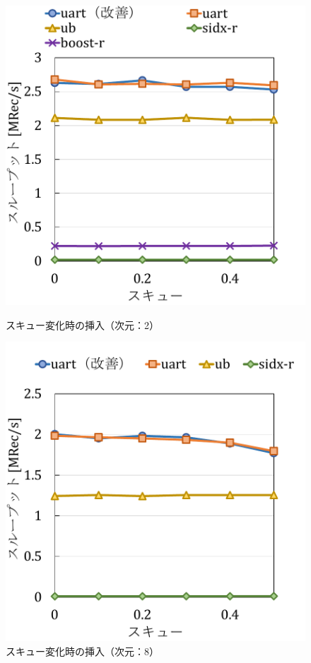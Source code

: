 \begin{figure}[tb]
  \begin{minipage}[c]{0.495\textwidth}
    \centering
    \includegraphics[scale=0.36]{./figures/graph-skew-insert-2.pdf}
    \caption{スキュー変化時の挿入（次元：2）}
    \label{graph:grouped}
  \end{minipage}
  \begin{minipage}[c]{0.495\textwidth}
    \centering
    \includegraphics[scale=0.36]{./figures/graph-skew-insert-8.pdf}
    \caption{スキュー変化時の挿入（次元：8）}
    \label{graph:paired}
  \end{minipage}
\end{figure}

